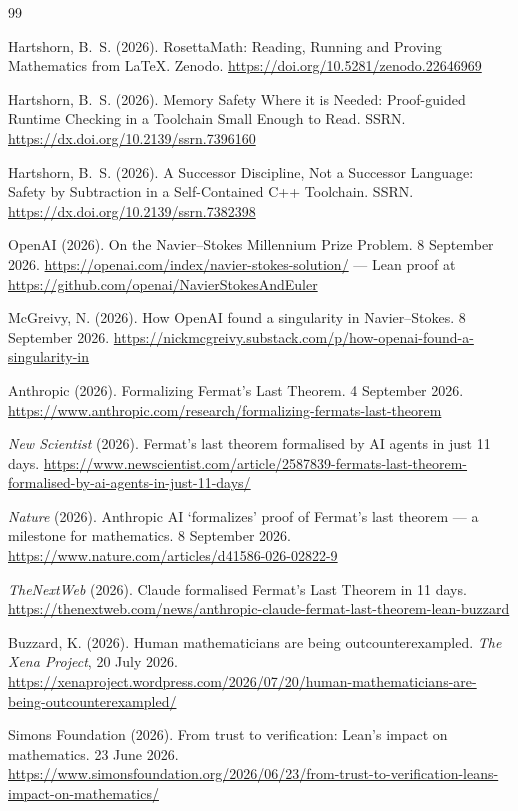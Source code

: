 \documentclass[11pt]{article}
\begin{document}
\begin{thebibliography}{99}

 Hartshorn, B.~S. (2026). RosettaMath: Reading,
Running and Proving Mathematics from \LaTeX{}. Zenodo.
\url{https://doi.org/10.5281/zenodo.22646969}

 Hartshorn, B.~S. (2026). Memory Safety Where it
is Needed: Proof-guided Runtime Checking in a Toolchain Small Enough to Read.
SSRN. \url{https://dx.doi.org/10.2139/ssrn.7396160}

 Hartshorn, B.~S. (2026). A Successor
Discipline, Not a Successor Language: Safety by Subtraction in a
Self-Contained C++ Toolchain. SSRN.
\url{https://dx.doi.org/10.2139/ssrn.7382398}

 OpenAI (2026). On the Navier--Stokes Millennium Prize
Problem. 8 September 2026.
\url{https://openai.com/index/navier-stokes-solution/} --- Lean proof at
\url{https://github.com/openai/NavierStokesAndEuler}

 McGreivy, N. (2026). How OpenAI found a singularity in
Navier--Stokes. 8 September 2026.
\url{https://nickmcgreivy.substack.com/p/how-openai-found-a-singularity-in}

 Anthropic (2026). Formalizing Fermat's Last Theorem.
4 September 2026.
\url{https://www.anthropic.com/research/formalizing-fermats-last-theorem}

 \emph{New Scientist} (2026). Fermat's last
theorem formalised by AI agents in just 11 days.
\url{https://www.newscientist.com/article/2587839-fermats-last-theorem-formalised-by-ai-agents-in-just-11-days/}

 \emph{Nature} (2026). Anthropic AI `formalizes' proof
of Fermat's last theorem --- a milestone for mathematics. 8 September 2026.
\url{https://www.nature.com/articles/d41586-026-02822-9}

 \emph{TheNextWeb} (2026). Claude formalised
Fermat's Last Theorem in 11 days.
\url{https://thenextweb.com/news/anthropic-claude-fermat-last-theorem-lean-buzzard}

 Buzzard, K. (2026). Human mathematicians are being
outcounterexampled. \emph{The Xena Project}, 20 July 2026.
\url{https://xenaproject.wordpress.com/2026/07/20/human-mathematicians-are-being-outcounterexampled/}

 Simons Foundation (2026). From trust to verification:
Lean's impact on mathematics. 23 June 2026.
\url{https://www.simonsfoundation.org/2026/06/23/from-trust-to-verification-leans-impact-on-mathematics/}


\end{thebibliography}
\end{document}
